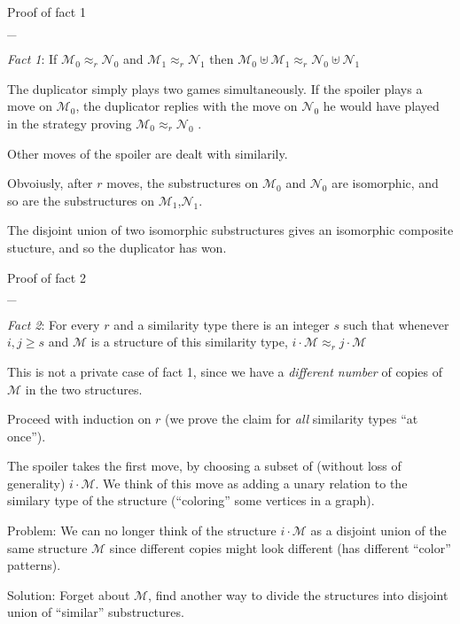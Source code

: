 \documentclass[landscape,a4]{myslides}
\begin{document}
\begin{slide}
\begin{center}
{%
\color{blue}
Proof of fact 1
}
\\
\_\hrulefill
\end{center}
\small
\emph{Fact 1}: If $\mathcal{M}_0\approx_r\mathcal{N}_0$ and $\mathcal{M}_1\approx_r\mathcal{N}_1$ then $\mathcal{M}_0\uplus\mathcal{M}_1\approx_r\mathcal{N}_0\uplus\mathcal{N}_1$

The duplicator simply plays two games simultaneously. If the spoiler plays a move on $\mathcal{M}_0$, the duplicator replies with the move on $\mathcal{N}_0$  he would have played in the strategy proving $\mathcal{M}_0\approx_r\mathcal{N}_0$ .

Other moves of the spoiler are dealt with similarily.

Obvoiusly, after $r$ moves, the substructures on $\mathcal{M}_0$ and $\mathcal{N}_0$ are isomorphic, and so are the substructures on $\mathcal{M}_1$,$\mathcal{N}_1$.

The disjoint union of two isomorphic substructures gives an isomorphic composite stucture, and so the duplicator has won.
\end{slide}

\begin{slide}
\begin{center}
{%
\color{blue}
Proof of fact 2
}
\\
\_\hrulefill
\end{center}
\small
\emph{Fact 2}: For every $r$ and a similarity type there is an integer $s$ such that whenever $i,j\ge s$ and $\mathcal{M}$ is a structure of this similarity type, $i\cdot\mathcal{M}\approx_rj\cdot\mathcal{M}$

This is not a private case of fact 1, since we have a \emph{different number} of copies of $\mathcal{M}$ in the two structures.

Proceed with induction on $r$ (we prove the claim for \emph{all} similarity types ``at once'').

The spoiler takes the first move, by choosing a subset of (without loss of generality) $i\cdot \mathcal{M}$. We think of this move as adding a unary relation to the similary type of the structure (``coloring'' some vertices in a graph).

Problem: We can no longer think of the structure $i\cdot \mathcal{M}$ as a disjoint union of the same structure $\mathcal{M}$ since different copies might look different (has different ``color'' patterns).

Solution: Forget about $\mathcal{M}$, find another way to divide the structures into disjoint union of ``similar'' substructures.

\end{slide}
\end{document}
